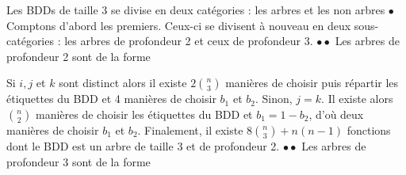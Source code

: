 \documentclass{article}
\begin{document}
Les BDDs de taille 3 se divise en deux catégories : les arbres et les non arbres
$\bullet$ Comptons d'abord les premiers. Ceux-ci se divisent à nouveau en deux sous-catégories : les arbres de profondeur 2 et ceux de profondeur 3.\newline
$\bullet \bullet$ Les arbres de profondeur 2 sont de la forme 
\begin{center}
\end{center}

Si $i,j$ et $k$ sont distinct alors il existe $2\binom{n}{3}$ manières de choisir puis répartir les étiquettes du BDD et 4 manières de choisir $b_1$ et $b_2$.\newline
Sinon, $j=k$. Il existe alors $\binom{n}{2}$ manières de choisir les étiquettes du BDD et $b_1 = 1-b_2$, d'où deux manières de choisir $b_1$ et $b_2$.\newline
Finalement, il existe $8\binom{n}{3} + n(n-1)$ fonctions dont le BDD est un arbre de taille 3 et de profondeur 2.\newline
$\bullet \bullet$ Les arbres de profondeur 3 sont de la forme 
\begin{center}
\end{center}
\end{document}
